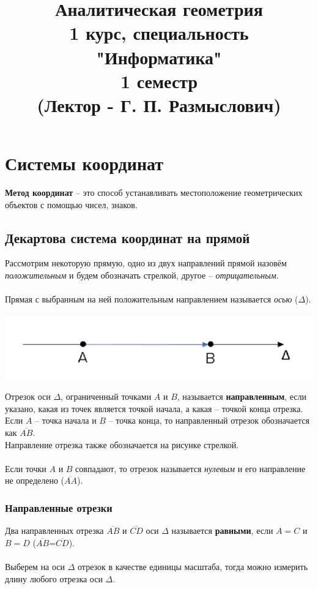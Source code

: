 \documentclass[a4paper, 12pt]{report}
\title{\textbf{Аналитическая геометрия}\\1 курс, специальность "Информатика"\\1 семестр\\(Лектор - Г. П. Размыслович)}
\date{}
\author{}
\begin{document}
	\maketitle
	\tableofcontents{}
	\chapter{Системы координат}
	\textbf{Метод координат} -- это способ устанавливать местоположение геометрических объектов с помощью чисел, знаков.
	\section{Декартова система координат на прямой}
	Рассмотрим некоторую прямую, одно из двух направлений прямой назовём \textit{положительным} и будем обозначать стрелкой, другое -- \textit{отрицательным}.\\\\
	Прямая с выбранным на ней положительным направлением называется \textit{осью} ($\Delta$).\\\\
	\includegraphics{img/axisdelta_AB.png}
	
	Отрезок оси $\Delta$, ограниченный точками $A$ и $B$, называется \textbf{направленным}, если указано, какая из точек является точкой начала, а какая -- точкой конца отрезка. Если $A$ -- точка начала и $B$ -- точка конца, то направленный отрезок обозначается как $\overline{AB}$.\\
	Направление отрезка также обозначается на рисунке стрелкой.\\\\
	
	Если точки $A$ и $B$ совпадают, то отрезок называется \textit{нулевым} и его направление не определено ($\overline{AA}$).
	\subsection*{Направленные отрезки}
	Два направленных отрезка $\overline{AB}$ и $\overline{CD}$ оси $\Delta$ называется \textbf{равными}, если $A = C$ и $B = D$ ($\overline{AB}$=$\overline{CD}$).\\\\
	Выберем на оси $\Delta$ отрезок в качестве единицы масштаба, тогда можно измерить длину любого отрезка оси $\Delta$.\\
	
\end{document}
